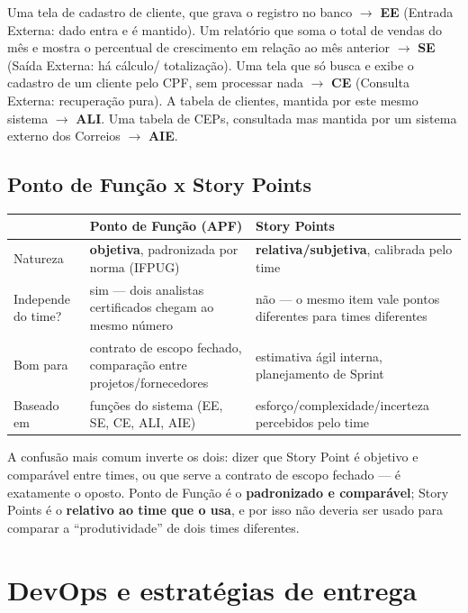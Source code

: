 \begin{exemplo}
Uma tela de cadastro de cliente, que grava o registro no banco $\to$
\textbf{EE} (Entrada Externa: dado entra e é mantido). Um relatório que
soma o total de vendas do mês e mostra o percentual de crescimento em
relação ao mês anterior $\to$ \textbf{SE} (Saída Externa: há cálculo/
totalização). Uma tela que só busca e exibe o cadastro de um cliente pelo
CPF, sem processar nada $\to$ \textbf{CE} (Consulta Externa: recuperação
pura). A tabela de clientes, mantida por este mesmo sistema $\to$
\textbf{ALI}. Uma tabela de CEPs, consultada mas mantida por um sistema
externo dos Correios $\to$ \textbf{AIE}.
\end{exemplo}

\subsection{Ponto de Função x Story Points}

\begin{conceito}
\begin{center}
\begin{tabular}{@{}p{2.8cm}p{4.7cm}p{4.7cm}@{}}
\toprule
& \textbf{Ponto de Função (APF)} & \textbf{Story Points} \\
\midrule
Natureza & \textbf{objetiva}, padronizada por norma (IFPUG) & \textbf{relativa/subjetiva}, calibrada pelo time \\
Independe do time? & sim --- dois analistas certificados chegam ao mesmo
número & não --- o mesmo item vale pontos diferentes para times
diferentes \\
Bom para & contrato de escopo fechado, comparação entre projetos/fornecedores & estimativa ágil interna, planejamento de Sprint \\
Baseado em & funções do sistema (EE, SE, CE, ALI, AIE) & esforço/complexidade/incerteza percebidos pelo time \\
\bottomrule
\end{tabular}
\end{center}
A confusão mais comum inverte os dois: dizer que Story Point é objetivo e
comparável entre times, ou que serve a contrato de escopo fechado --- é
exatamente o oposto. Ponto de Função é o \textbf{padronizado e comparável};
Story Points é o \textbf{relativo ao time que o usa}, e por isso não deveria
ser usado para comparar a “produtividade” de dois times diferentes.
\end{conceito}

\section{DevOps e estratégias de entrega}

